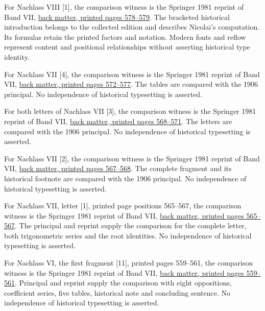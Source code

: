 For Nachlass VIII [1], the comparison witness is the Springer 1981 reprint of Band VII, \href{https://link.springer.com/content/pdf/bbm:978-3-642-92478-1/1}{back matter, printed pages 578--579}. The bracketed historical introduction belongs to the collected edition and describes Nicolai's computation. Its formulas retain the printed factors and notation. Modern fonts and reflow represent content and positional relationships without asserting historical type identity.



For Nachlass VII [4], the comparison witness is the Springer 1981 reprint of Band VII, \href{https://link.springer.com/content/pdf/bbm:978-3-642-92478-1/1}{back matter, printed pages 572--577}. The tables are compared with the 1906 principal. No independence of historical typesetting is asserted.



For both letters of Nachlass VII [3], the comparison witness is the Springer 1981 reprint of Band VII, \href{https://link.springer.com/content/pdf/bbm:978-3-642-92478-1/1}{back matter, printed pages 568--571}. The letters are compared with the 1906 principal. No independence of historical typesetting is asserted.



For Nachlass VII [2], the comparison witness is the Springer 1981 reprint of Band VII, \href{https://link.springer.com/content/pdf/bbm:978-3-642-92478-1/1}{back matter, printed pages 567--568}. The complete fragment and its historical footnote are compared with the 1906 principal. No independence of historical typesetting is asserted.



For Nachlass VII, letter [1], printed page positions 565--567, the comparison witness is the Springer 1981 reprint of Band VII, \href{https://link.springer.com/content/pdf/bbm:978-3-642-92478-1/1}{back matter, printed pages 565--567}. The principal and reprint supply the comparison for the complete letter, both trigonometric series and the root identities. No independence of historical typesetting is asserted.



For Nachlass VI, the first fragment [11], printed pages 559--561, the comparison witness is the Springer 1981 reprint of Band VII, \href{https://link.springer.com/content/pdf/bbm:978-3-642-92478-1/1}{back matter, printed pages 559--561}. Principal and reprint supply the comparison with eight oppositions, coefficient series, five tables, historical note and concluding sentence. No independence of historical typesetting is asserted.



